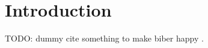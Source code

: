 \section{Introduction}\label{sec:intro}







TODO: dummy cite something to make biber happy \textcite{EPRINT:NicRufSeu20}.

